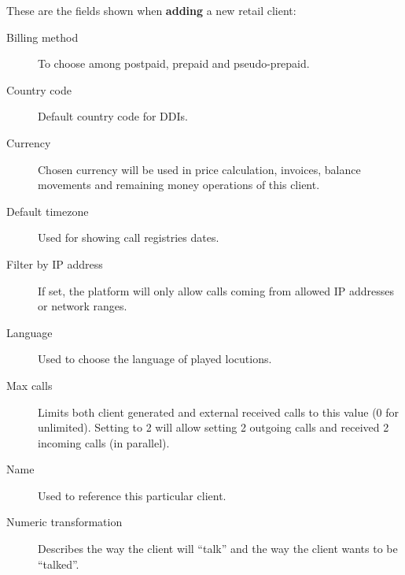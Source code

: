 \documentclass[letterpaper,10pt,english]{sphinxmanual}
\begin{document}
These are the fields shown when \textbf{adding} a new retail client:
\begin{description}
\item[{Billing method}] \leavevmode{}\label{administration_portal/brand/clients/retail:term-billing-method}
To choose among postpaid, prepaid and pseudo-prepaid.

\item[{Country code}] \leavevmode{}\label{administration_portal/brand/clients/retail:term-country-code}
Default country code for DDIs.

\item[{Currency}] \leavevmode{}\label{administration_portal/brand/clients/retail:term-currency}
Chosen currency will be used in price calculation, invoices, balance movements and
remaining money operations of this client.

\item[{Default timezone}] \leavevmode{}\label{administration_portal/brand/clients/retail:term-default-timezone}
Used for showing call registries dates.

\item[{Filter by IP address}] \leavevmode{}\label{administration_portal/brand/clients/retail:term-filter-by-ip-address}
If set, the platform will only allow calls coming from allowed IP addresses or network ranges.

\item[{Language}] \leavevmode{}\label{administration_portal/brand/clients/retail:term-language}
Used to choose the language of played locutions.

\item[{Max calls}] \leavevmode{}\label{administration_portal/brand/clients/retail:term-max-calls}
Limits both client generated and external received calls to this value (0 for unlimited). Setting to 2 will allow
setting 2 outgoing calls and received 2 incoming calls (in parallel).

\item[{Name}] \leavevmode{}\label{administration_portal/brand/clients/retail:term-name}
Used to reference this particular client.

\item[{Numeric transformation}] \leavevmode{}\label{administration_portal/brand/clients/retail:term-numeric-transformation}
Describes the way the client will ``talk'' and the way the client wants to be ``talked''.

\end{description}
\end{document}
